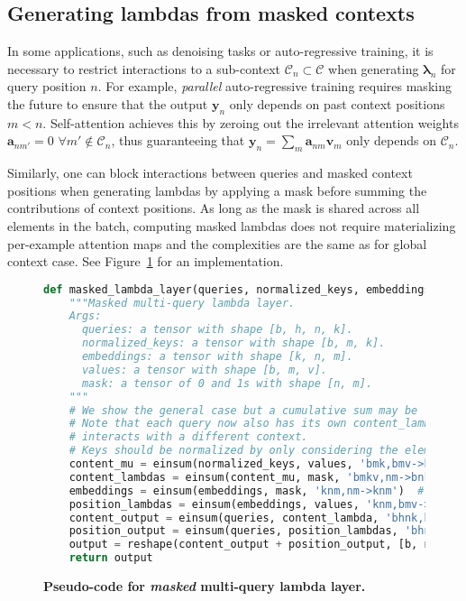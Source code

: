 \documentclass{article} \usepackage{iclr2021_conference,times}
\begin{document}
\subsection{Generating lambdas from masked contexts\label{sec:masked_lambda_layer}}
In some applications, such as denoising tasks or auto-regressive training, it is necessary to restrict interactions to a sub-context $\mathcal{C}_n \subset \mathcal{C}$ when generating $\boldsymbol{\lambda}_n$ for query position $n$.
For example, \emph{parallel} auto-regressive training requires masking the future to ensure that the output $\boldsymbol{y}_n$ only depends on past context positions $m < n$.
Self-attention achieves this by zeroing out the irrelevant attention weights $\boldsymbol{a}_{nm'}=0$ $\forall m' \notin \mathcal{C}_n$,  thus guaranteeing that $\boldsymbol{y}_n = \sum_m \boldsymbol{a}_{nm} \boldsymbol{v}_m$ only depends on $\mathcal{C}_n$.

Similarly, one can block interactions between queries and masked context positions when generating lambdas by applying a mask before summing the contributions of context positions. 
As long as the mask is shared across all elements in the batch, computing masked lambdas does not require materializing per-example attention maps and the complexities are the same as for global context case.
See Figure~\ref{fig:masked_lambda_layer_code} for an implementation.

\lstset{style=codestyle}
\begin{figure}[h!]
\small
\begin{lstlisting}[language=python]
def masked_lambda_layer(queries, normalized_keys, embeddings, values, mask):
    """Masked multi-query lambda layer.
    Args:
      queries: a tensor with shape [b, h, n, k].
      normalized_keys: a tensor with shape [b, m, k].
      embeddings: a tensor with shape [k, n, m].
      values: a tensor with shape [b, m, v].
      mask: a tensor of 0 and 1s with shape [n, m].
    """
    # We show the general case but a cumulative sum may be faster for masking the future.
    # Note that each query now also has its own content_lambda since every query 
    # interacts with a different context.
    # Keys should be normalized by only considering the elements in their contexts.
    content_mu = einsum(normalized_keys, values, 'bmk,bmv->bmkv')
    content_lambdas = einsum(content_mu, mask, 'bmkv,nm->bnkv')
    embeddings = einsum(embeddings, mask, 'knm,nm->knm')  # apply mask to embeddings
    position_lambdas = einsum(embeddings, values, 'knm,bmv->bnkv')
    content_output = einsum(queries, content_lambda, 'bhnk,bnkv->bnhv')
    position_output = einsum(queries, position_lambdas, 'bhnk,bnkv->bnhv')
    output = reshape(content_output + position_output, [b, n, d])
    return output
\end{lstlisting}
    \vspace{-0.2cm}
    \caption{\textbf{Pseudo-code for \emph{masked} multi-query lambda layer.}}
    \label{fig:masked_lambda_layer_code}
\end{figure}
\end{document}
